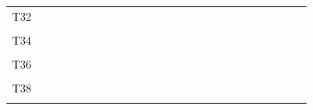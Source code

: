 \documentclass[
]{article}
\begin{document}
\begin{longtable}[l]{lllllllllllllllllllllllll}
T32 &  &  &  &  &  &  &  &  &  &  &  &  &  &  &  &  &  &  &  &  &  &  &  & \\
\cellcolor{gray!6}{T33} & \cellcolor{gray!6}{} & \cellcolor{gray!6}{} & \cellcolor{gray!6}{} & \cellcolor{gray!6}{} & \cellcolor{gray!6}{} & \cellcolor{gray!6}{} & \cellcolor{gray!6}{} & \cellcolor{gray!6}{} & \cellcolor{gray!6}{} & \cellcolor{gray!6}{} & \cellcolor{gray!6}{} & \cellcolor{gray!6}{} & \cellcolor{gray!6}{} & \cellcolor{gray!6}{} & \cellcolor{gray!6}{} & \cellcolor{gray!6}{} & \cellcolor{gray!6}{} & \cellcolor{gray!6}{} & \cellcolor{gray!6}{} & \cellcolor{gray!6}{} & \cellcolor{gray!6}{} & \cellcolor{gray!6}{} & \cellcolor{gray!6}{} & \cellcolor{gray!6}{}\\
T34 &  &  &  &  &  &  &  &  &  &  &  &  &  &  &  &  &  &  &  &  &  &  &  & \\
\cellcolor{gray!6}{T35} & \cellcolor{gray!6}{} & \cellcolor{gray!6}{} & \cellcolor{gray!6}{} & \cellcolor{gray!6}{} & \cellcolor{gray!6}{} & \cellcolor{gray!6}{} & \cellcolor{gray!6}{} & \cellcolor{gray!6}{} & \cellcolor{gray!6}{} & \cellcolor{gray!6}{} & \cellcolor{gray!6}{} & \cellcolor{gray!6}{} & \cellcolor{gray!6}{} & \cellcolor{gray!6}{} & \cellcolor{gray!6}{} & \cellcolor{gray!6}{} & \cellcolor{gray!6}{} & \cellcolor{gray!6}{} & \cellcolor{gray!6}{} & \cellcolor{gray!6}{} & \cellcolor{gray!6}{} & \cellcolor{gray!6}{} & \cellcolor{gray!6}{} & \cellcolor{gray!6}{}\\
\addlinespace
T36 &  &  &  &  &  &  &  &  &  &  &  &  &  &  &  &  &  &  &  &  &  &  &  & \\
\cellcolor{gray!6}{T37} & \cellcolor{gray!6}{} & \cellcolor{gray!6}{} & \cellcolor{gray!6}{} & \cellcolor{gray!6}{} & \cellcolor{gray!6}{} & \cellcolor{gray!6}{} & \cellcolor{gray!6}{} & \cellcolor{gray!6}{} & \cellcolor{gray!6}{} & \cellcolor{gray!6}{} & \cellcolor{gray!6}{} & \cellcolor{gray!6}{} & \cellcolor{gray!6}{} & \cellcolor{gray!6}{} & \cellcolor{gray!6}{} & \cellcolor{gray!6}{} & \cellcolor{gray!6}{} & \cellcolor{gray!6}{} & \cellcolor{gray!6}{} & \cellcolor{gray!6}{} & \cellcolor{gray!6}{} & \cellcolor{gray!6}{} & \cellcolor{gray!6}{} & \cellcolor{gray!6}{}\\
T38 &  &  &  &  &  &  &  &  &  &  &  &  &  &  &  &  &  &  &  &  &  &  &  & \\
\cellcolor{gray!6}{T39} & \cellcolor{gray!6}{} & \cellcolor{gray!6}{} & \cellcolor{gray!6}{} & \cellcolor{gray!6}{} & \cellcolor{gray!6}{} & \cellcolor{gray!6}{} & \cellcolor{gray!6}{} & \cellcolor{gray!6}{} & \cellcolor{gray!6}{} & \cellcolor{gray!6}{} & \cellcolor{gray!6}{} & \cellcolor{gray!6}{} & \cellcolor{gray!6}{} & \cellcolor{gray!6}{} & \cellcolor{gray!6}{} & \cellcolor{gray!6}{} & \cellcolor{gray!6}{} & \cellcolor{gray!6}{} & \cellcolor{gray!6}{} & \cellcolor{gray!6}{} & \cellcolor{gray!6}{} & \cellcolor{gray!6}{} & \cellcolor{gray!6}{} & \cellcolor{gray!6}{}\\

\end{longtable}
\end{document}
